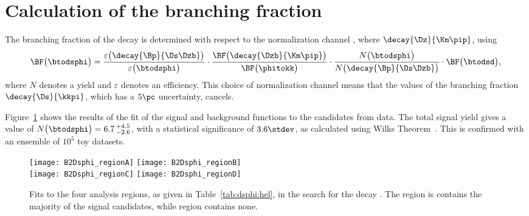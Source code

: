\section{Calculation of the branching fraction}
\label{sec:dsphi:bf}
The branching fraction of the decay \btodsphi is determined with respect to the normalization
channel \btodsd, where $\decay{\Dz}{\Km\pip}$, using
\begin{equation}
  \BF\big(\btodsphi\big) =
  \frac{\varepsilon\big(\decay{\Bp}{\Ds\Dzb}\big)}{\varepsilon\big(\btodsphi\big)}
  \cdot
  \frac{\BF\big(\decay{\Dzb}{\Km\pip}\big)}{\BF\big(\phitokk\big)}
  \cdot
  \frac{N\big(\btodsphi\big)}{N\big(\decay{\Bp}{\Ds\Dzb}\big)}
  \cdot
  \BF\big(\btodsd\big)
  , \\
  \label{eq:dsphi:bf}
\end{equation}
where $N$ denotes a yield and $\varepsilon$ denotes an efficiency.
This choice of normalization channel means that the values of the branching fraction
$\decay{\Ds}{\kkpi}$, which has a $5\pc$ uncertainty, cancels.







Figure~\ref{fig:dsphi:fits} shows the results of the fit of the signal and background functions to
the \btodsphi candidates from data.
The total signal yield gives a value of $N\big(\btodsphi\big)=6.7\,^{+4.5}_{-2.6}$, with a
statistical significance of $3.6\stdev$, as calculated using Wilks Theorem~\cite{wilks1938}.
This is confirmed with an ensemble of $10^5$ toy datasets.

\begin{figure}
  \begin{center}
    \texttt{[image: B2Dsphi\_regionA]}
    \texttt{[image: B2Dsphi\_regionB]}\\
    \texttt{[image: B2Dsphi\_regionC]}
    \texttt{[image: B2Dsphi\_regionD]}
    \caption[Fits to \btodsphi data]
    {\small
      Fits to the four analysis regions, as given in Table~\ref{tab:dsphi:hel}, in the search for
      the decay \btodsphi.
      The region \rA is contains the majority of the signal candidates, while region \rD contains
      none.
    }
    \label{fig:dsphi:fits}
  \end{center}
\end{figure}

